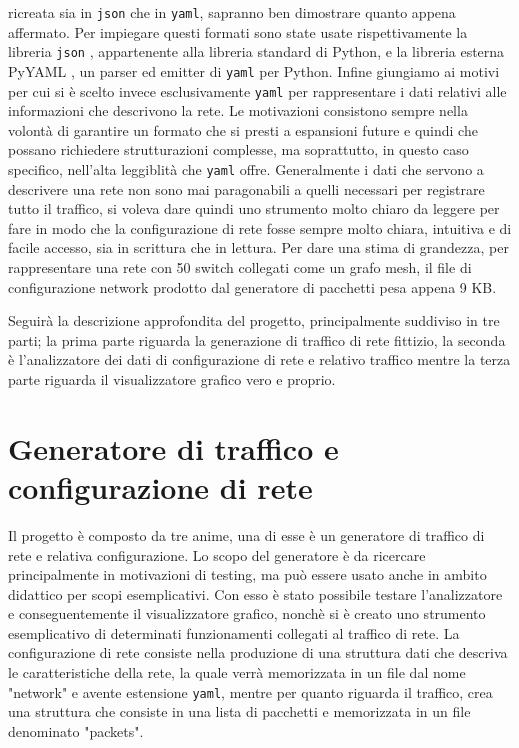 \documentclass[binding=0.6cm]{sapthesis}
\begin{document}
ricreata sia in \texttt{json} che in \texttt{yaml}, sapranno ben
dimostrare quanto appena affermato. Per impiegare questi formati sono state usate rispettivamente la libreria \texttt{json} \cite{PythonJSONLibrary}, appartenente alla libreria standard di Python, e la
libreria esterna PyYAML \cite{PyYAMLDocumentation}, un parser ed emitter di \texttt{yaml} per Python.
Infine giungiamo ai motivi per cui si è scelto invece esclusivamente \texttt{yaml} per rappresentare i 
dati relativi alle informazioni che descrivono la rete. Le motivazioni consistono sempre nella volontà
di garantire un formato che si presti a espansioni future e quindi che possano richiedere strutturazioni complesse, ma soprattutto,
in questo caso specifico, nell'alta leggiblità che \texttt{yaml} offre. Generalmente i dati che servono a descrivere una rete non sono mai paragonabili a quelli
necessari per registrare tutto il traffico, si voleva dare quindi uno strumento molto chiaro da leggere per fare in modo che la configurazione di rete
fosse sempre molto chiara, intuitiva e di facile accesso, sia in scrittura che in lettura. 
Per dare una stima di grandezza, per rappresentare una rete con 50 switch collegati come un grafo mesh, il file
di configurazione network prodotto dal generatore di pacchetti pesa appena 9 KB.


Seguirà la descrizione approfondita del progetto, principalmente suddiviso in tre parti; la prima 
parte riguarda la generazione di traffico di rete fittizio, la seconda è l'analizzatore dei dati di configurazione di rete e relativo traffico mentre la terza
parte riguarda il visualizzatore grafico vero e proprio.

\chapter{Generatore di traffico e configurazione di rete}

Il progetto è composto da tre anime, una di esse è un generatore di traffico di rete e relativa configurazione.
Lo scopo del generatore è da ricercare principalmente in motivazioni di testing, ma può essere
 usato anche in ambito didattico per scopi
esemplicativi. Con esso è stato possibile testare l'analizzatore e conseguentemente il visualizzatore grafico, nonchè si è creato 
uno strumento esemplicativo di determinati funzionamenti collegati al traffico di rete.
La configurazione di rete consiste nella produzione di una struttura dati che descriva 
le caratteristiche della rete, la quale
verrà memorizzata in un file dal nome "network" e avente estensione \texttt{yaml}, mentre per quanto
riguarda il traffico, crea una struttura che consiste in una lista di pacchetti e memorizzata in un file denominato "packets".
\end{document}
